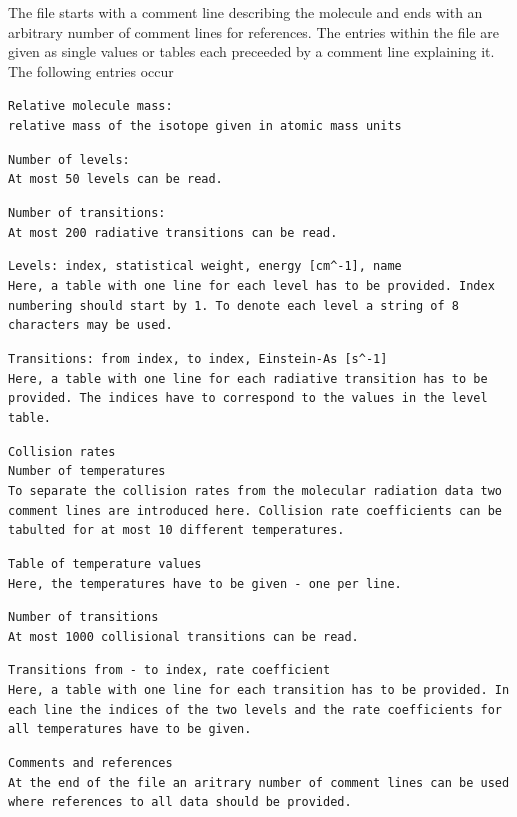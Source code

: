 The file starts with a comment line describing the molecule and ends with
an arbitrary number of comment lines for references. The entries
within the file are given as single values or tables each 
preceeded by a comment line explaining it. The following entries occur
\begin{description}
\item{}\tt Relative molecule mass:\\ \rm
 relative mass of the isotope given in atomic mass units
\item{}\tt Number of levels:\\ \rm
At most 50 levels can be read.
\item{}\tt Number of transitions:\\ \rm
At most 200 radiative transitions can be read.
\item{}\tt Levels: index, statistical weight, energy [cm\^{}-1], name\\ \rm
Here, a table with one line for each level has to be provided.
Index numbering should start by 1. To denote each level a string of 
8 characters may be used.
\item{}\tt Transitions: from index, to index, Einstein-As [s\^{}-1]\\ \rm
Here, a table with one line for each radiative transition has to be provided.
The indices have to correspond to the values in the level table.
\item{}\tt Collision rates\\
Number of temperatures\\ \rm
To separate the collision rates from the molecular radiation data
two comment lines are introduced here. Collision rate coefficients
can be tabulted for at most 10 different temperatures.
\item{}\tt Table of temperature values\\ \rm
Here, the temperatures have to be given - one per line.
\item{}\tt Number of transitions\\ \rm
At most 1000 collisional transitions can be read.
\item{}\tt Transitions from - to index,  rate coefficient\\ \rm
Here, a table with one line for each transition has to be provided.
In each line the indices of the two levels and the rate coefficients
for all temperatures have to be given.
\item{}\tt Comments and references\\ \rm
At the end of the file an aritrary number of comment lines
can be used where references to all data should be provided.
\end{description}

